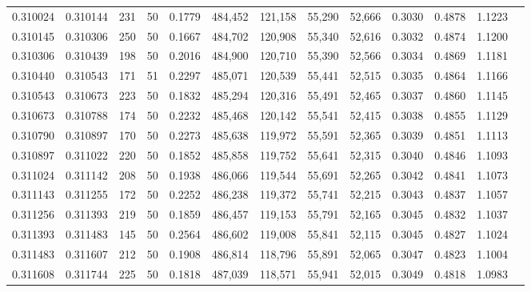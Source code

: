 \begin{tabular}{rrrrrrrrrrrrr}
0.310024 & 0.310144 &   231 &  50 &                                     0.1779 & 484,452 & 121,158 &  55,290 &  52,666 & 0.3030 & 0.4878 & 1.1223 \\
0.310145 & 0.310306 &   250 &  50 &                                     0.1667 & 484,702 & 120,908 &  55,340 &  52,616 & 0.3032 & 0.4874 & 1.1200 \\
0.310306 & 0.310439 &   198 &  50 &                                     0.2016 & 484,900 & 120,710 &  55,390 &  52,566 & 0.3034 & 0.4869 & 1.1181 \\
0.310440 & 0.310543 &   171 &  51 &                                     0.2297 & 485,071 & 120,539 &  55,441 &  52,515 & 0.3035 & 0.4864 & 1.1166 \\
0.310543 & 0.310673 &   223 &  50 &                                     0.1832 & 485,294 & 120,316 &  55,491 &  52,465 & 0.3037 & 0.4860 & 1.1145 \\
0.310673 & 0.310788 &   174 &  50 &                                     0.2232 & 485,468 & 120,142 &  55,541 &  52,415 & 0.3038 & 0.4855 & 1.1129 \\
0.310790 & 0.310897 &   170 &  50 &                                     0.2273 & 485,638 & 119,972 &  55,591 &  52,365 & 0.3039 & 0.4851 & 1.1113 \\
0.310897 & 0.311022 &   220 &  50 &                                     0.1852 & 485,858 & 119,752 &  55,641 &  52,315 & 0.3040 & 0.4846 & 1.1093 \\
0.311024 & 0.311142 &   208 &  50 &                                     0.1938 & 486,066 & 119,544 &  55,691 &  52,265 & 0.3042 & 0.4841 & 1.1073 \\
0.311143 & 0.311255 &   172 &  50 &                                     0.2252 & 486,238 & 119,372 &  55,741 &  52,215 & 0.3043 & 0.4837 & 1.1057 \\
0.311256 & 0.311393 &   219 &  50 &                                     0.1859 & 486,457 & 119,153 &  55,791 &  52,165 & 0.3045 & 0.4832 & 1.1037 \\
0.311393 & 0.311483 &   145 &  50 &                                     0.2564 & 486,602 & 119,008 &  55,841 &  52,115 & 0.3045 & 0.4827 & 1.1024 \\
0.311483 & 0.311607 &   212 &  50 &                                     0.1908 & 486,814 & 118,796 &  55,891 &  52,065 & 0.3047 & 0.4823 & 1.1004 \\
0.311608 & 0.311744 &   225 &  50 &                                     0.1818 & 487,039 & 118,571 &  55,941 &  52,015 & 0.3049 & 0.4818 & 1.0983 \\

\end{tabular}
